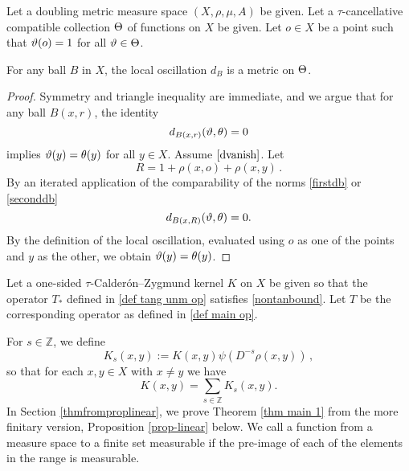 Let a doubling metric measure space $(X,\rho,\mu, A)$ be given.
Let a $\tau$-cancellative compatible collection $\Theta$ of functions on $X$ be given. 
Let $o\in X$ be a point such that $\vartheta(o)=1$
for all $\vartheta\in \Theta$.

\begin{lemma}
    For any ball $B$ in $X$, the local oscillation
$d_{B}$ is a metric on $\Theta$.
\end{lemma}

\begin{proof}
    Symmetry and triangle inequality are immediate, and we argue that
for any ball $B(x,r)$, the identity
\begin{equation}\label{dvanish}
d_{B(x,r)}(\vartheta,\theta)=0
\end{equation}
implies $\vartheta(y)=\theta(y)$ for all $y\in X$. Assume $\eqref{dvanish}$.
Let
\begin{equation}
    R=1+\rho(x,o)+\rho(x,y)\, .
\end{equation}
By an iterated application of
the comparability of the norms \eqref{firstdb} or \eqref{seconddb} 
\begin{equation}
    d_{B(x,R)}(\vartheta,\theta)=0.
\end{equation}
By the definition of
the local oscillation, evaluated using $o$ as one of the points and $y$ as the other, we obtain
$\vartheta(y)=\theta(y)$.
\end{proof}

Let a one-sided $\tau$-Calder\'on--Zygmund kernel $K$ on $X$ be given so that the operator $T_*$ defined in \eqref{def tang unm op}
satisfies
\eqref{nontanbound}. Let $T$ be the corresponding operator as defined in \eqref{def main op}.


For $s\in\mathbb{Z}$, we define
\begin{equation}\label{defks}
    K_s(x,y):=K(x,y)\psi(D^{-s}\rho(x,y))\,,
\end{equation}
so that for each $x, y \in X$ with $x\neq y$  we have
$$K(x,y)=\sum_{s\in\mathbb{Z}}K_s(x,y).$$
    In Section \ref{thmfromproplinear}, we prove Theorem \ref{thm main 1}
    from the more finitary version, Proposition \ref{prop-linear} below. We call a function from a measure space to a finite set measurable if the pre-image of each of the elements in the range is measurable.

